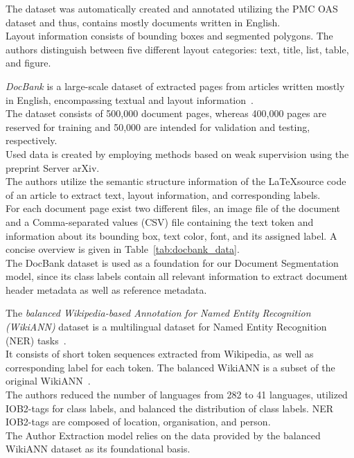 The dataset was automatically created and annotated utilizing the PMC OAS dataset and thus, contains mostly documents written in English.\\
Layout information consists of bounding boxes and segmented polygons. The authors distinguish between five different layout categories: text, title, list, table, and figure.\par
\textit{DocBank} is a large-scale dataset of extracted pages from articles written mostly in English, encompassing textual and layout information~\cite{li2020docbank}.\\
The dataset consists of 500,000 document pages, whereas 400,000 pages are reserved for training and 50,000 are intended for validation and testing, respectively.\\
Used data is created by employing methods based on weak supervision using the preprint Server arXiv.\\
The authors utilize the semantic structure information of the \LaTeX source code of an article to extract text, layout information, and corresponding labels.\\
For each document page exist two different files, an image file of the document and a Comma-separated values (CSV) file containing the text token and information about its bounding box, text color, font, and its assigned label. A concise overview is given in Table~\ref{tab:docbank_data}.\\
The DocBank dataset is used as a foundation for our Document Segmentation model, since its class labels contain all relevant information to extract document header metadata as well as reference metadata.\par
The \textit{balanced Wikipedia-based Annotation for Named Entity Recognition (WikiANN)} dataset is a multilingual dataset for Named Entity Recognition (NER) tasks~\cite{rahimi2019massively}.\\
It consists of short token sequences extracted from Wikipedia, as well as corresponding label for each token. The balanced WikiANN is a subset of the original WikiANN~\cite{pan-etal-2017-cross}.\\
The authors reduced the number of languages from 282 to 41 languages, utilized IOB2-tags for class labels, and balanced the distribution of class labels. NER IOB2-tags are composed of location, organisation, and person.\\
The Author Extraction model relies on the data provided by the balanced WikiANN dataset as its foundational basis.\par
